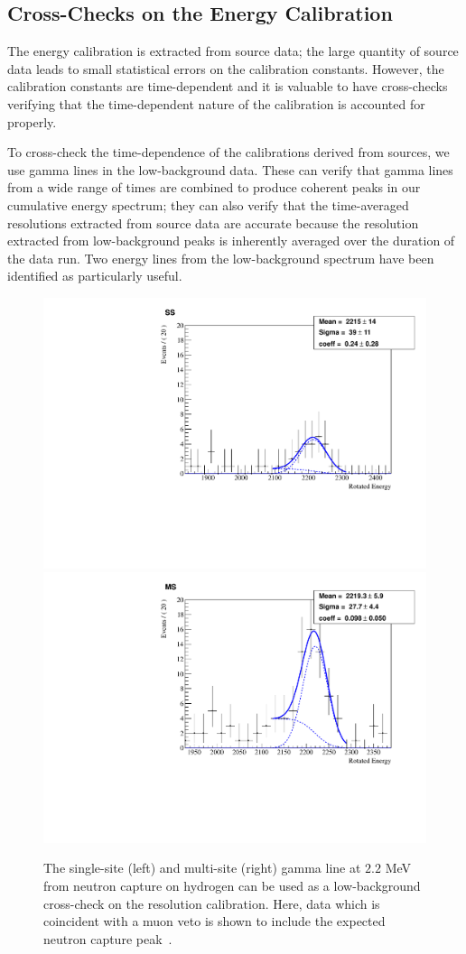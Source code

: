 \subsection{Cross-Checks on the Energy Calibration}

The energy calibration is extracted from source data; the large quantity of source data leads to small statistical errors on the calibration constants.  However, the calibration constants are time-dependent and it is valuable to have cross-checks verifying that the time-dependent nature of the calibration is accounted for properly.

To cross-check the time-dependence of the calibrations derived from sources, we use gamma lines in the low-background data.  These can verify that gamma lines from a wide range of times are combined to produce coherent peaks in our cumulative energy spectrum; they can also verify that the time-averaged resolutions extracted from source data are accurate because the resolution extracted from low-background peaks is inherently averaged over the duration of the data run.  Two energy lines from the low-background spectrum have been identified as particularly useful.

\begin{figure}
\begin{center}
\includegraphics[keepaspectratio=true,width=.49\textwidth]{neutronHydrogen_ss_denoised.pdf}
\includegraphics[keepaspectratio=true,width=.49\textwidth]{neutronHydrogen_ms_denoised.pdf}
\end{center}
\renewcommand{\baselinestretch}{1}
\small\normalsize
\begin{quote}
\caption{The single-site (left) and multi-site (right) gamma line at $2.2$ MeV from neutron capture on hydrogen can be used as a low-background cross-check on the resolution calibration.  Here, data which is coincident with a muon veto is shown to include the expected neutron capture peak~\cite{EnergyDocumentRun2ab}.}
\label{fig:neutronHydrogenCheck}
\end{quote}
\end{figure}
\renewcommand{\baselinestretch}{2}
\small\normalsize

